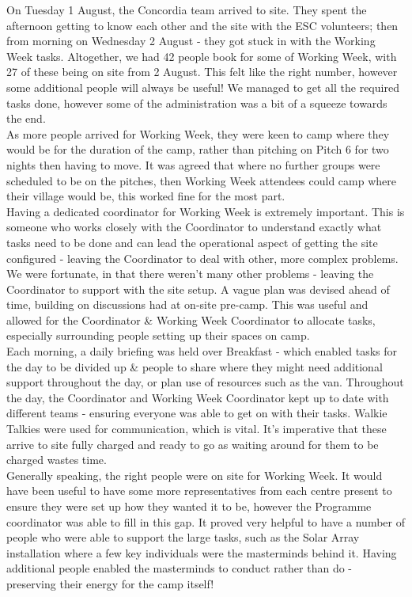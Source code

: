 On Tuesday 1 August, the Concordia team arrived to site. They spent the afternoon getting to know each other and the site with the ESC volunteers; then from morning on Wednesday 2 August - they got stuck in with the Working Week tasks. Altogether, we had 42 people book for some of Working Week, with 27 of these being on site from 2 August. This felt like the right number, however some additional people will always be useful! We managed to get all the required tasks done, however some of the administration was a bit of a squeeze towards the end. \\

As more people arrived for Working Week, they were keen to camp where they would be for the duration of the camp, rather than pitching on Pitch 6 for two nights then having to move. It was agreed that where no further groups were scheduled to be on the pitches, then Working Week attendees could camp where their village would be, this worked fine for the most part. \\

Having a dedicated coordinator for Working Week is extremely important. This is someone who works closely with the Coordinator to understand exactly what tasks need to be done and can lead the operational aspect of getting the site configured - leaving the Coordinator to deal with other, more complex problems. We were fortunate, in that there weren't many other problems - leaving the Coordinator to support with the site setup. A vague plan was devised ahead of time, building on discussions had at on-site pre-camp. This was useful and allowed for the Coordinator \& Working Week Coordinator to allocate tasks, especially surrounding people setting up their spaces on camp.\\

Each morning, a daily briefing was held over Breakfast - which enabled tasks for the day to be divided up \& people to share where they might need additional support throughout the day, or plan use of resources such as the van. Throughout the day, the Coordinator and Working Week Coordinator kept up to date with different teams - ensuring everyone was able to get on with their tasks. Walkie Talkies were used for communication, which is vital. It's imperative that these arrive to site fully charged and ready to go as waiting around for them to be charged wastes time.\\

Generally speaking, the right people were on site for Working Week. It would have been useful to have some more representatives from each centre present to ensure they were set up how they wanted it to be, however the Programme coordinator was able to fill in this gap. It proved very helpful to have a number of people who were able to support the large tasks, such as the Solar Array installation where a few key individuals were the masterminds behind it. Having additional people enabled the masterminds to conduct rather than do - preserving their energy for the camp itself!\\

